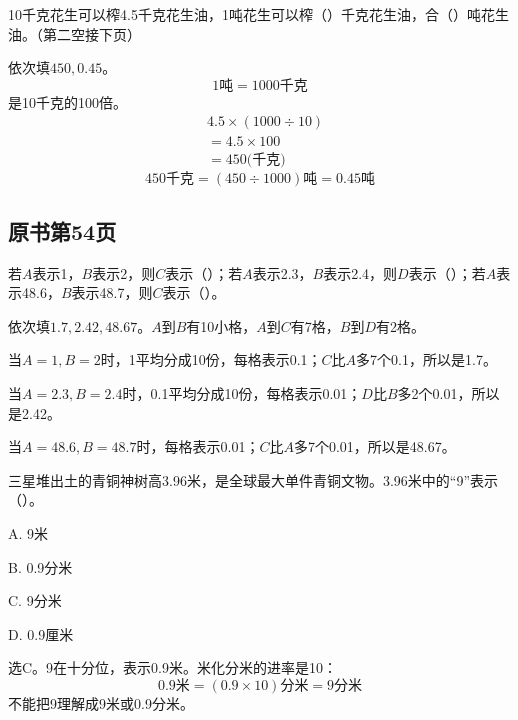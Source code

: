 10千克花生可以榨4.5千克花生油，1吨花生可以榨（\hspace{1.8em}）千克花生油，合（\hspace{1.8em}）吨花生油。（第二空接下页）\par
\begin{BookAnswer}
依次填\(450,0.45\)。\[1\text{吨}=1000\text{千克}\]是10千克的100倍。\[\begin{aligned}&4.5\times(1000\div10)\\&=4.5\times100\\&=450\text{(千克)}\end{aligned}\]\[450\text{千克}=(450\div1000)\text{吨}=0.45\text{吨}\]
\end{BookAnswer}



\subsection*{原书第54页}

若\(A\)表示1，\allowbreak{}\(B\)表示2，则\(C\)表示（\hspace{1.8em}）；若\(A\)表示2.3，\allowbreak{}\(B\)表示2.4，则\(D\)表示（\hspace{1.8em}）；若\(A\)表示48.6，\allowbreak{}\(B\)表示48.7，则\(C\)表示（\hspace{1.8em}）。\par
{}
\begin{BookAnswer}
依次填\(1.7,2.42,48.67\)。\(A\)到\(B\)有10小格，\allowbreak{}\(A\)到\(C\)有7格，\allowbreak{}\(B\)到\(D\)有2格。\par 当\(A=1,B=2\)时，1平均分成10份，每格表示0.1；\allowbreak{}\(C\)比\(A\)多7个0.1，所以是1.7。\par 当\(A=2.3,B=2.4\)时，0.1平均分成10份，每格表示0.01；\allowbreak{}\(D\)比\(B\)多2个0.01，所以是2.42。\par 当\(A=48.6,B=48.7\)时，每格表示0.01；\allowbreak{}\(C\)比\(A\)多7个0.01，所以是48.67。
\end{BookAnswer}

三星堆出土的青铜神树高3.96米，是全球最大单件青铜文物。3.96米中的“9”表示（\hspace{1.8em}）。\par
\noindent A. 9米\par
\noindent B. 0.9分米\par
\noindent C. 9分米\par
\noindent D. 0.9厘米\par
\begin{BookAnswer}
选C。9在十分位，表示0.9米。米化分米的进率是10：\[0.9\text{米}=(0.9\times10)\text{分米}=9\text{分米}\]不能把9理解成9米或0.9分米。
\end{BookAnswer}


